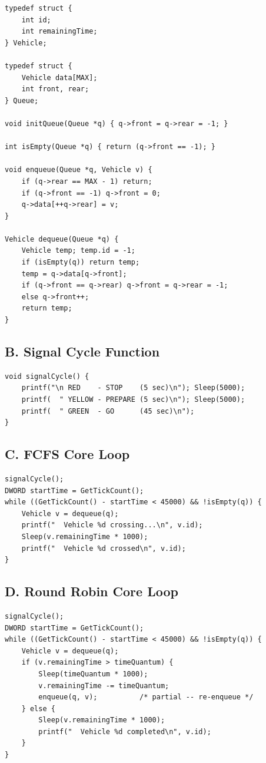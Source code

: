 \documentclass[12pt,a4paper]{article}
\begin{document}
\begin{lstlisting}[caption={Queue struct and core operations}]
typedef struct {
    int id;
    int remainingTime;
} Vehicle;

typedef struct {
    Vehicle data[MAX];
    int front, rear;
} Queue;

void initQueue(Queue *q) { q->front = q->rear = -1; }

int isEmpty(Queue *q) { return (q->front == -1); }

void enqueue(Queue *q, Vehicle v) {
    if (q->rear == MAX - 1) return;
    if (q->front == -1) q->front = 0;
    q->data[++q->rear] = v;
}

Vehicle dequeue(Queue *q) {
    Vehicle temp; temp.id = -1;
    if (isEmpty(q)) return temp;
    temp = q->data[q->front];
    if (q->front == q->rear) q->front = q->rear = -1;
    else q->front++;
    return temp;
}
\end{lstlisting}

\subsection{B. Signal Cycle Function}

\begin{lstlisting}[caption={Signal cycle with real-time delays}]
void signalCycle() {
    printf("\n RED    - STOP    (5 sec)\n"); Sleep(5000);
    printf(  " YELLOW - PREPARE (5 sec)\n"); Sleep(5000);
    printf(  " GREEN  - GO      (45 sec)\n");
}
\end{lstlisting}

\subsection{C. FCFS Core Loop}

\begin{lstlisting}[caption={FCFS green-phase dispatch loop}]
signalCycle();
DWORD startTime = GetTickCount();
while ((GetTickCount() - startTime < 45000) && !isEmpty(q)) {
    Vehicle v = dequeue(q);
    printf("  Vehicle %d crossing...\n", v.id);
    Sleep(v.remainingTime * 1000);
    printf("  Vehicle %d crossed\n", v.id);
}
\end{lstlisting}

\subsection{D. Round Robin Core Loop}

\begin{lstlisting}[caption={Round Robin green-phase dispatch loop}]
signalCycle();
DWORD startTime = GetTickCount();
while ((GetTickCount() - startTime < 45000) && !isEmpty(q)) {
    Vehicle v = dequeue(q);
    if (v.remainingTime > timeQuantum) {
        Sleep(timeQuantum * 1000);
        v.remainingTime -= timeQuantum;
        enqueue(q, v);          /* partial -- re-enqueue */
    } else {
        Sleep(v.remainingTime * 1000);
        printf("  Vehicle %d completed\n", v.id);
    }
}
\end{lstlisting}
\end{document}
